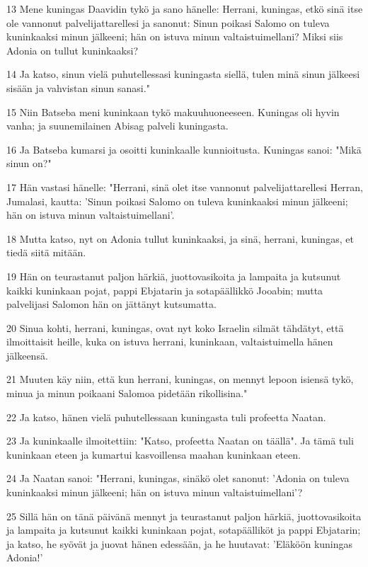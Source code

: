 \par 13 Mene kuningas Daavidin tykö ja sano hänelle: Herrani, kuningas, etkö sinä itse ole vannonut palvelijattarellesi ja sanonut: Sinun poikasi Salomo on tuleva kuninkaaksi minun jälkeeni; hän on istuva minun valtaistuimellani? Miksi siis Adonia on tullut kuninkaaksi?
\par 14 Ja katso, sinun vielä puhutellessasi kuningasta siellä, tulen minä sinun jälkeesi sisään ja vahvistan sinun sanasi."
\par 15 Niin Batseba meni kuninkaan tykö makuuhuoneeseen. Kuningas oli hyvin vanha; ja suunemilainen Abisag palveli kuningasta.
\par 16 Ja Batseba kumarsi ja osoitti kuninkaalle kunnioitusta. Kuningas sanoi: "Mikä sinun on?"
\par 17 Hän vastasi hänelle: "Herrani, sinä olet itse vannonut palvelijattarellesi Herran, Jumalasi, kautta: 'Sinun poikasi Salomo on tuleva kuninkaaksi minun jälkeeni; hän on istuva minun valtaistuimellani'.
\par 18 Mutta katso, nyt on Adonia tullut kuninkaaksi, ja sinä, herrani, kuningas, et tiedä siitä mitään.
\par 19 Hän on teurastanut paljon härkiä, juottovasikoita ja lampaita ja kutsunut kaikki kuninkaan pojat, pappi Ebjatarin ja sotapäällikkö Jooabin; mutta palvelijasi Salomon hän on jättänyt kutsumatta.
\par 20 Sinua kohti, herrani, kuningas, ovat nyt koko Israelin silmät tähdätyt, että ilmoittaisit heille, kuka on istuva herrani, kuninkaan, valtaistuimella hänen jälkeensä.
\par 21 Muuten käy niin, että kun herrani, kuningas, on mennyt lepoon isiensä tykö, minua ja minun poikaani Salomoa pidetään rikollisina."
\par 22 Ja katso, hänen vielä puhutellessaan kuningasta tuli profeetta Naatan.
\par 23 Ja kuninkaalle ilmoitettiin: "Katso, profeetta Naatan on täällä". Ja tämä tuli kuninkaan eteen ja kumartui kasvoillensa maahan kuninkaan eteen.
\par 24 Ja Naatan sanoi: "Herrani, kuningas, sinäkö olet sanonut: 'Adonia on tuleva kuninkaaksi minun jälkeeni; hän on istuva minun valtaistuimellani'?
\par 25 Sillä hän on tänä päivänä mennyt ja teurastanut paljon härkiä, juottovasikoita ja lampaita ja kutsunut kaikki kuninkaan pojat, sotapäälliköt ja pappi Ebjatarin; ja katso, he syövät ja juovat hänen edessään, ja he huutavat: 'Eläköön kuningas Adonia!'
